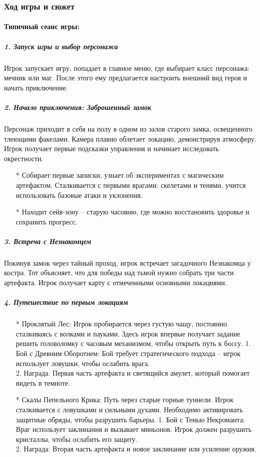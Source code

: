 \documentclass{article}
\begin{document}
\subsubsection{Ход игры и сюжет}
\paragraph{Типичный сеанс игры: }
\subparagraph{1. Запуск игры и выбор персонажа \\}
Игрок запускает игру, попадает в главное меню, где выбирает класс персонажа: мечник или маг. После этого ему предлагается настроить внешний вид героя и начать приключение. 
\subparagraph{2. Начало приключения: Заброшенный замок \\}
Персонаж приходит в себя на полу в одном из залов старого замка, освещенного тлеющими факелами. Камера плавно облетает локацию, демонстрируя атмосферу. Игрок получает первые подсказки управления и начинает исследовать окрестности.
\begin{itemize}
\item[*] Собирает первые записки, узнает об экспериментах с магическим артефактом.
Сталкивается с первыми врагами: скелетами и тенями, учится использовать базовые атаки и уклонения.
\item[*] Находит сейв-зону – старую часовню, где можно восстановить здоровье и сохранить прогресс.
\end{itemize}
\subparagraph{3. Встреча с Незнакомцем \\}
Покинув замок через тайный проход, игрок встречает загадочного Незнакомца у костра. Тот объясняет, что для победы над тьмой нужно собрать три части артефакта. Игрок получает карту с отмеченными основными локациями. \\
\subparagraph{4. Путешествие по первым локациям \\}
\begin{itemize}
\item[*] Проклятый Лес: Игрок пробирается через густую чащу, постоянно сталкиваясь с волками и пауками. Здесь игрок впервые получает задание решить головоломку с часовым механизмом, чтобы открыть путь к боссу.
1. Бой с Древним Оборотнем: Бой требует стратегического подхода – игрок использует ловушки, чтобы ослабить врага. \\
2. Награда: Первая часть артефакта и светящийся амулет, который помогает видеть в темноте.
\item[*] Скалы Пепельного Крика: Путь через старые горные туннели. Игрок сталкивается с ловушками и сильными духами. Необходимо активировать защитные обряды, чтобы разрушить барьеры.
1. Бой с Тенью Некроманта: Враг использует заклинания и вызывает миньонов. Игрок должен разрушить кристаллы, чтобы ослабить его защиту. \\
2. Награда: Вторая часть артефакта и новое заклинание или усиление оружия. \\
\end{itemize}
\end{document}
